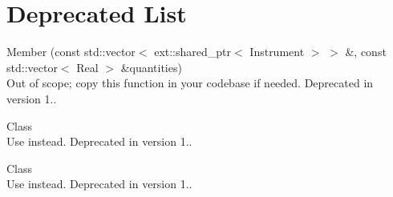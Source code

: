 \chapter{Deprecated List}
\hypertarget{deprecated}{}\label{deprecated}

\begin{DoxyRefList}
\item[Member \doxylink{namespace_quant_lib_a0c277356fbdba31d3a62c61e8a3ce0dc}{Quant\+Lib\+::aggregate\+NPV} (const std\+::vector\texorpdfstring{$<$}{<} ext\+::shared\+\_\+ptr$<$ Instrument $>$ \texorpdfstring{$>$}{>} \&, const std\+::vector$<$ Real $>$ \&quantities)]\hfill \\
\label{deprecated__deprecated000031}%
%
Out of scope; copy this function in your codebase if needed. Deprecated in version 1..  
\item[Class \doxylink{class_quant_lib_1_1_arithmetic_average_o_i_s}{Quant\+Lib\+::Arithmetic\+Average\+OIS} ]\hfill \\
\label{deprecated__deprecated000011}%
%
Use  instead. Deprecated in version 1..  
\item[Class \doxylink{class_quant_lib_1_1_arithmetic_o_i_s_rate_helper}{Quant\+Lib\+::Arithmetic\+OISRate\+Helper} ]\hfill \\
\label{deprecated__deprecated000012}%
%
Use  instead. Deprecated in version 1..  
\item[Member \doxylink{class_quant_lib_1_1_asset_swap_a7afa7ae3116d95a74009688992501115}{Quant\+Lib\+::Asset\+Swap\+::Asset\+Swap} (bool par\+Asset\+Swap, ext\+::shared\+\_\+ptr$<$ Bond $>$ bond, \doxylink{namespace_quant_lib_a372ac5c1a422a6b276fe0552d4d83f50}{Real} bond\+Clean\+Price, \doxylink{namespace_quant_lib_a372ac5c1a422a6b276fe0552d4d83f50}{Real} non\+Par\+Repayment, \doxylink{namespace_quant_lib_a372ac5c1a422a6b276fe0552d4d83f50}{Real} gearing, const ext\+::shared\+\_\+ptr$<$ Ibor\+Index $>$ \&ibor\+Index, \doxylink{namespace_quant_lib_ad61d2e1a3f01154233de0d5fbb85177c}{Spread} spread=0.\+0, const \doxylink{class_quant_lib_1_1_day_counter}{Day\+Counter} \&floating\+Day\+Count=Day\+Counter(), \doxylink{class_quant_lib_1_1_date}{Date} deal\+Maturity=Date(), bool pay\+Bond\+Coupon=false)]\hfill \\

\end{DoxyRefList}
